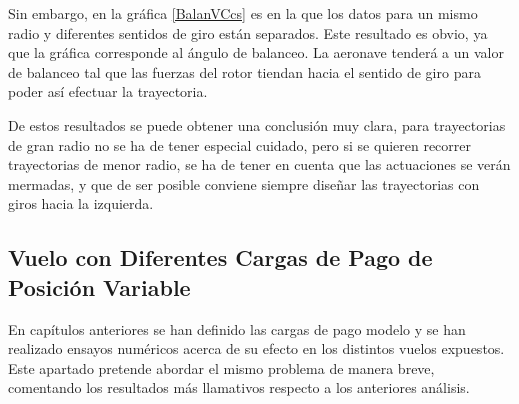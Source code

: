 Sin embargo, en la gráfica \ref{BalanVCcs} es en la que los datos para un mismo radio y diferentes sentidos de giro están separados. Este resultado es obvio, ya que la gráfica corresponde al ángulo de balanceo. La aeronave tenderá a un valor de balanceo tal que las fuerzas del rotor tiendan hacia el sentido de giro para poder así efectuar la trayectoria.

De estos resultados se puede obtener una conclusión muy clara, para trayectorias de gran radio no se ha de tener especial cuidado, pero si se quieren recorrer trayectorias de menor radio, se ha de tener en cuenta que las actuaciones se verán mermadas, y que de ser posible conviene siempre diseñar las trayectorias con giros hacia la izquierda.

\subsection*{Vuelo con Diferentes Cargas de Pago de Posición Variable}

En capítulos anteriores se han definido las cargas de pago modelo y se han realizado ensayos numéricos acerca de su efecto en los distintos vuelos expuestos. Este apartado pretende abordar el mismo problema de manera breve, comentando los resultados más llamativos respecto a los anteriores análisis.

